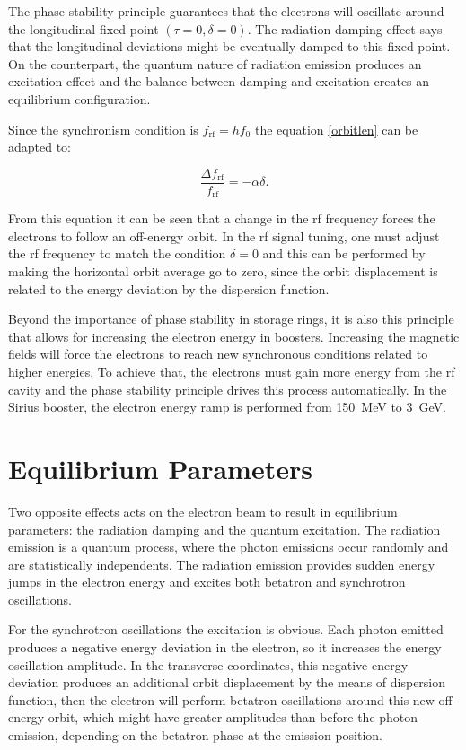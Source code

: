 The phase stability principle guarantees that the electrons will oscillate around the longitudinal fixed point $(\tau = 0, \delta = 0)$. The radiation damping effect says that the longitudinal deviations might be eventually damped to this fixed point. On the counterpart, the quantum nature of radiation emission produces an excitation effect and the balance between damping and excitation creates an equilibrium configuration.

Since the synchronism condition is $f_{\mathrm{rf}} = h f_0$ the equation \eqref{orbitlen} can be adapted to:

\begin{equation}
    \dfrac{\Delta f_{\mathrm{rf}}}{f_{\mathrm{rf}}} = -\alpha \delta.
    \label{eq:delta_freq}
\end{equation}

From this equation it can be seen that a change in the \gls{rf} frequency forces the electrons to follow an off-energy orbit. In the \gls{rf} signal tuning, one must adjust the \gls{rf} frequency to match the condition $\delta = 0$ and this can be performed by making the horizontal orbit average go to zero, since the orbit displacement is related to the energy deviation by the dispersion function.

Beyond the importance of phase stability in storage rings, it is also this principle that allows for increasing the electron energy in boosters. Increasing the magnetic fields will force the electrons to reach new synchronous conditions related to higher energies. To achieve that, the electrons must gain more energy from the \gls{rf} cavity and the phase stability principle drives this process automatically. In the Sirius booster, the electron energy ramp is performed from \SI{150}{\mega \electronvolt} to \SI{3}{\giga \electronvolt}.

\section{Equilibrium Parameters}\label{equilibrium}

Two opposite effects acts on the electron beam to result in equilibrium parameters: the radiation damping and the quantum excitation. The radiation emission is a quantum process, where the photon emissions occur randomly and are statistically independents. The radiation emission provides sudden energy jumps in the electron energy and excites both betatron and synchrotron oscillations.

For the synchrotron oscillations the excitation is obvious. Each photon emitted produces a negative energy deviation in the electron, so it increases the energy oscillation amplitude. In the transverse coordinates, this negative energy deviation produces an additional orbit displacement by the means of dispersion function, then the electron will perform betatron oscillations around this new off-energy orbit, which might have greater amplitudes than before the photon emission, depending on the betatron phase at the emission position.

